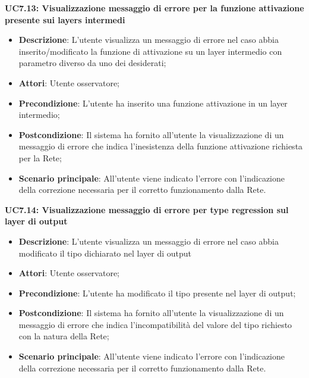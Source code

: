 \textbf{UC7.13: Visualizzazione messaggio di errore per la funzione attivazione presente sui layers intermedi}\mbox{}
\label{UC7.13: Visualizzazione messaggio di errore per la funzione attivazione presente sui layers intermedi}
\noindent
\begin{itemize}
\item \textbf{Descrizione}: L'utente visualizza un messaggio di errore nel caso abbia inserito/modificato la funzione di attivazione su un layer intermedio con parametro diverso da uno dei desiderati;
\item \textbf{Attori}: Utente osservatore;
\item \textbf{Precondizione}: L'utente ha inserito una funzione attivazione in un layer intermedio;
\item \textbf{Postcondizione}: Il sistema ha fornito all'utente la visualizzazione di un messaggio di errore che indica l'inesistenza della funzione attivazione richiesta per la Rete;
\item \textbf{Scenario principale}: All'utente viene indicato l'errore con l'indicazione della correzione necessaria per il corretto funzionamento dalla Rete.
\end{itemize}

\textbf{UC7.14: Visualizzazione messaggio di errore per type regression sul layer di output}\mbox{}
\label{UC7.14: Visualizzazione messaggio di errore per type regression sul layer di output}
\noindent
\begin{itemize}
\item \textbf{Descrizione}: L'utente visualizza un messaggio di errore nel caso abbia modificato il tipo dichiarato nel layer di output
\item \textbf{Attori}: Utente osservatore;
\item \textbf{Precondizione}: L'utente ha modificato il tipo presente nel layer di output;
\item \textbf{Postcondizione}: Il sistema ha fornito all'utente la visualizzazione di un messaggio di errore che indica l'incompatibilit\`a del valore del tipo richiesto con la natura della Rete;
\item \textbf{Scenario principale}: All'utente viene indicato l'errore con l'indicazione della correzione necessaria per il corretto funzionamento dalla Rete.
\end{itemize}


